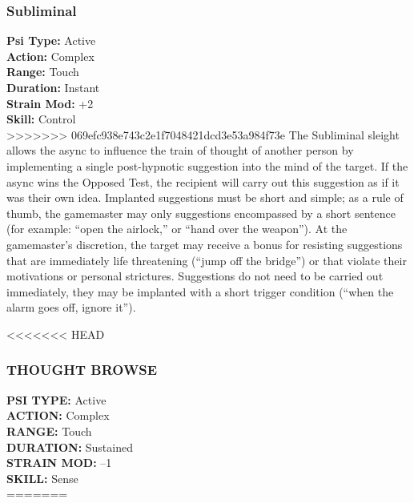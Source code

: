 \subsubsection{Subliminal}
\textbf{Psi Type:} Active \\ 
\textbf{Action:} Complex \\ 
\textbf{Range:} Touch \\ 
\textbf{Duration:} Instant \\
\textbf{Strain Mod:} +2 \\ 
\textbf{Skill:} Control\\
>>>>>>> 069efc938e743c2e1f7048421dcd3e53a984f73e
The Subliminal sleight allows the async to influence
the train of thought of another person by implementing
a single post-hypnotic suggestion into the mind
of the target. If the async wins the Opposed Test, the
recipient will carry out this suggestion as if it was
their own idea. Implanted suggestions must be short
and simple; as a rule of thumb, the gamemaster may
only suggestions encompassed by a short sentence
(for example: “open the airlock,” or “hand over the
weapon”). At the gamemaster’s discretion, the target
may receive a bonus for resisting suggestions that are
immediately life threatening (“jump off the bridge”)
or that violate their motivations or personal strictures.
Suggestions do not need to be carried out immediately,
they may be implanted with a short trigger condition
(“when the alarm goes off, ignore it”).

<<<<<<< HEAD
\subsubsection{THOUGHT BROWSE}
\textbf{PSI TYPE:} Active \\ 
\textbf{ACTION:} Complex \\ 
\textbf{RANGE:} Touch \\ 
\textbf{DURATION:} Sustained \\
\textbf{STRAIN MOD:} –1 \\ 
\textbf{SKILL:} Sense\\
=======
